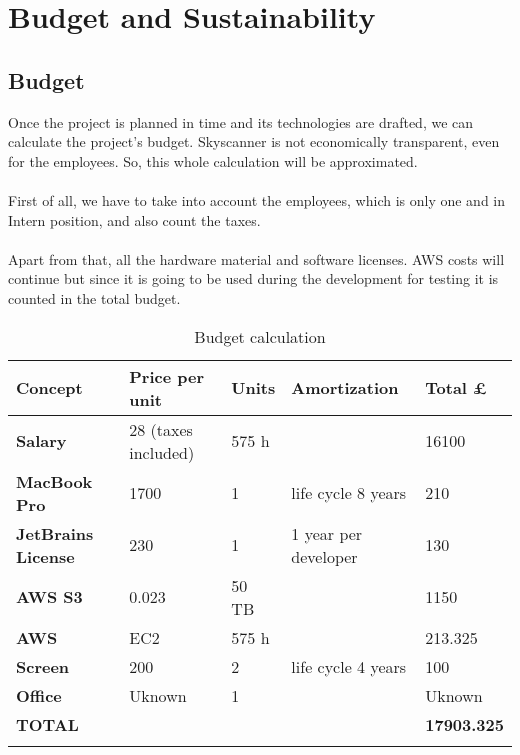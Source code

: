 
\chapter{Budget and Sustainability}

\label{chapter06}

\section{Budget}

Once the project is planned in time and its technologies are drafted, we can calculate the project’s budget.
Skyscanner is not economically transparent, even for the employees. So, this whole calculation will be approximated.
\\\\
First of all, we have to take into account the employees, which is only one and in Intern position, and also count the taxes.
\\\\
Apart from that, all the hardware material and software licenses. AWS costs will continue but since it is going to be used during the development for testing it is counted in the total budget.

\begin{table}[H]
\centering
\begin{tabular}{|l|l|l|l|l|}
\hline
\textbf{Concept}           & \textbf{Price per unit} & \textbf{Units} & \textbf{Amortization} & \textbf{Total £}   \\ \hline
\textbf{Salary}            & 28 (taxes included)     & 575 h          &                       & 16100              \\ \hline
\textbf{MacBook Pro}       & 1700                    & 1              & life cycle 8 years    & 210                \\ \hline
\textbf{JetBrains License} & 230                     & 1              & 1 year per developer  & 130                \\ \hline
\textbf{AWS S3}            & 0.023                   & 50 TB          &                       & 1150               \\ \hline
\textbf{AWS}               & EC2                     & 575 h          &                       & 213.325            \\ \hline
\textbf{Screen}            & 200                     & 2              & life cycle 4 years    & 100                \\ \hline
\textbf{Office}            & Uknown                  & 1              &                       & Uknown             \\ \hline
\textbf{TOTAL}             &                         &                &                       & \textbf{17903.325} \\ \hline
\caption{Budget calculation}
\label{budget-calculation}
\end{tabular}
\end{table}

